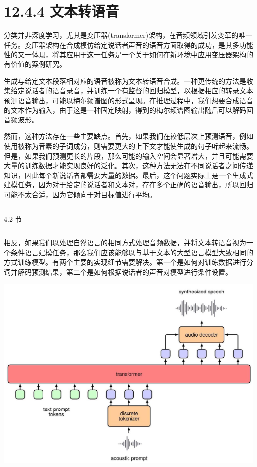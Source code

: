 \documentclass[10pt]{report}
\newcommand{\HRule}{\begin{center}\rule{0.9\linewidth}{0.2mm}\end{center}}
\begin{document}
\section*{12.4.4 文本转语音}

分类并非深度学习，尤其是变压器(transformer)架构，在音频领域引发变革的唯一任务。变压器架构在合成模仿给定说话者声音的语音方面取得的成功，是其多功能性的又一体现，将其应用于这一任务是一个关于如何在新环境中应用变压器架构的有价值的案例研究。

生成与给定文本段落相对应的语音被称为文本转语音合成。一种更传统的方法是收集给定说话者的语音录音，并训练一个有监督的回归模型，以根据相应的转录文本预测语音输出，可能以梅尔频谱图的形式呈现。在推理过程中，我们想要合成语音的文本作为输入，由于这是一种固定映射，得到的梅尔频谱图输出随后可以解码回音频波形。

然而，这种方法存在一些主要缺点。首先，如果我们在较低层次上预测语音，例如使用被称为音素的子词成分，则需要更大的上下文才能使生成的句子听起来流畅。但是，如果我们预测更长的片段，那么可能的输入空间会显著增大，并且可能需要大量的训练数据才能实现良好的泛化。其次，这种方法无法在不同说话者之间传递知识，因此每个新说话者都需要大量的数据。最后，这个问题实际上是一个生成式建模任务，因为对于给定的说话者和文本对，存在多个正确的语音输出，所以回归可能不太合适，因为它倾向于对目标值进行平均。

\HRule

4.2 节

\HRule

相反，如果我们以处理自然语言的相同方式处理音频数据，并将文本转语音视为一个条件语言建模任务，那么我们应该能够以与基于文本的大型语言模型大致相同的方式训练模型。有两个主要的实现细节需要解决。第一个是如何对训练数据进行分词并解码预测结果，第二个是如何根据说话者的声音对模型进行条件设置。

\begin{center}
\includegraphics[max width=1.0\textwidth]{images/0194e279-9b28-703a-88f4-c3ac21e2010d_420_244_339_1304_936_0.jpg}
\end{center}
\hspace*{3em} 
\end{document}
